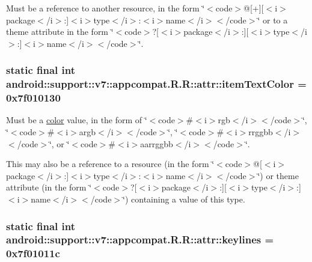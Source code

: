 Must be a reference to another resource, in the form \char`\"{}$<$code$>$@\mbox{[}+\mbox{]}\mbox{[}$<$i$>$package$<$/i$>$:\mbox{]}$<$i$>$type$<$/i$>$:$<$i$>$name$<$/i$>$$<$/code$>$\char`\"{} or to a theme attribute in the form \char`\"{}$<$code$>$?\mbox{[}$<$i$>$package$<$/i$>$:\mbox{]}\mbox{[}$<$i$>$type$<$/i$>$:\mbox{]}$<$i$>$name$<$/i$>$$<$/code$>$\char`\"{}. \hypertarget{classandroid_1_1support_1_1v7_1_1appcompat_1_1_r_1_1attr_3c984c8c0fdcea7f4fc5bd9ba206736f}{
\subsubsection[{itemTextColor}]{\setlength{\rightskip}{0pt plus 5cm}static final int android::support::v7::appcompat.R.R::attr::itemTextColor = 0x7f010130}}
\label{classandroid_1_1support_1_1v7_1_1appcompat_1_1_r_1_1attr_3c984c8c0fdcea7f4fc5bd9ba206736f}


Must be a \hyperlink{classandroid_1_1support_1_1v7_1_1appcompat_1_1_r_1_1color}{color} value, in the form of \char`\"{}$<$code$>$\#$<$i$>$rgb$<$/i$>$$<$/code$>$\char`\"{}, \char`\"{}$<$code$>$\#$<$i$>$argb$<$/i$>$$<$/code$>$\char`\"{}, \char`\"{}$<$code$>$\#$<$i$>$rrggbb$<$/i$>$$<$/code$>$\char`\"{}, or \char`\"{}$<$code$>$\#$<$i$>$aarrggbb$<$/i$>$$<$/code$>$\char`\"{}. 

This may also be a reference to a resource (in the form \char`\"{}$<$code$>$@\mbox{[}$<$i$>$package$<$/i$>$:\mbox{]}$<$i$>$type$<$/i$>$:$<$i$>$name$<$/i$>$$<$/code$>$\char`\"{}) or theme attribute (in the form \char`\"{}$<$code$>$?\mbox{[}$<$i$>$package$<$/i$>$:\mbox{]}\mbox{[}$<$i$>$type$<$/i$>$:\mbox{]}$<$i$>$name$<$/i$>$$<$/code$>$\char`\"{}) containing a value of this type. \hypertarget{classandroid_1_1support_1_1v7_1_1appcompat_1_1_r_1_1attr_cba39030dcc0b157aacafb916426f914}{
\subsubsection[{keylines}]{\setlength{\rightskip}{0pt plus 5cm}static final int android::support::v7::appcompat.R.R::attr::keylines = 0x7f01011c}}
\label{classandroid_1_1support_1_1v7_1_1appcompat_1_1_r_1_1attr_cba39030dcc0b157aacafb916426f914}


